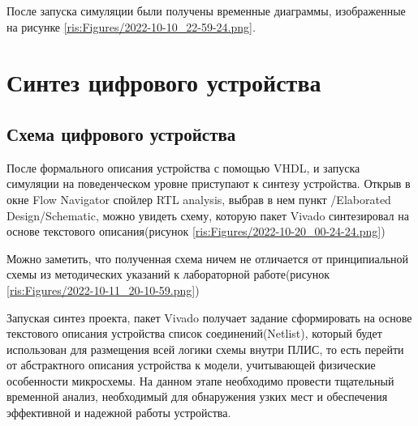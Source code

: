 \begin{sloppypar}
После запуска симуляции были получены временные диаграммы, изображенные на рисунке \ref{ris:Figures/2022-10-10_22-59-24.png}.




\newpage %
\section{Синтез цифрового устройства} %
\subsection{Схема цифрового устройства} %

После формального описания устройства с помощью VHDL, и запуска симуляции на поведенческом уровне приступают к синтезу устройства. Открыв в окне Flow Navigator спойлер RTL analysis, выбрав в нем пункт /Elaborated Design/Schematic, можно увидеть схему, которую пакет Vivado синтезировал на основе текстового описания(рисунок \ref{ris:Figures/2022-10-20_00-24-24.png})


Можно заметить, что полученная схема ничем не отличается от принципиальной схемы из методических указаний к лабораторной работе(рисунок \ref{ris:Figures/2022-10-11_20-10-59.png})

Запуская синтез проекта, пакет Vivado получает задание сформировать на основе текстового описания устройства список соединений(Netlist), который будет использован для размещения всей логики схемы внутри ПЛИС, то есть перейти от абстрактного описания устройства к модели, учитывающей физические особенности микросхемы. На данном этапе необходимо провести тщательный временной анализ, необходимый для обнаружения узких мест и обеспечения эффективной и надежной работы устройства. 


\end{sloppypar}
